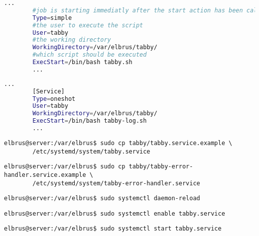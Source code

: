 	\lstset{style=files}
	\begin{lstlisting}[caption={tabby.service.example - Die Variable 'WorkingDirectory' sowie die Variable 'User' anpassen.},language=bash ,keywords={WorkingDirectory, User}, keywordstyle=\color{red}, firstnumber=5]
		...
		#job is starting immediatly after the start action has been called
		Type=simple
		#the user to execute the script
		User=tabby
		#the working directory
		WorkingDirectory=/var/elbrus/tabby/
		#which script should be executed
		ExecStart=/bin/bash tabby.sh
		...
	\end{lstlisting}

	\lstset{style=files}
	\begin{lstlisting}[caption={tabby-error-handler.service.example - Die Variable 'WorkingDirectory' sowie die Variable 'User' anpassen.},language=bash ,keywords={WorkingDirectory, User}, keywordstyle=\color{red}, firstnumber=5]
		...
		[Service]
		Type=oneshot
		User=tabby
		WorkingDirectory=/var/elbrus/tabby/
		ExecStart=/bin/bash tabby-log.sh
		...
	\end{lstlisting}
	\newpage
	
	\lstset{style=commands}
	\begin{lstlisting}[caption={Kopieren des Serviceprogrammes.}]
		elbrus@server:/var/elbrus$ sudo cp tabby/tabby.service.example \
		/etc/systemd/system/tabby.service
	\end{lstlisting}
	
	\lstset{style=commands}
	\begin{lstlisting}[caption={Kopieren des Errorhandlers.}]
		elbrus@server:/var/elbrus$ sudo cp tabby/tabby-error-handler.service.example \
		/etc/systemd/system/tabby-error-handler.service
	\end{lstlisting}
	
	\lstset{style=commands}
	\begin{lstlisting}[caption={Neuladen des 'systemctl' Deamons.}]
		elbrus@server:/var/elbrus$ sudo systemctl daemon-reload
	\end{lstlisting}
	
	\lstset{style=commands}
	\begin{lstlisting}[caption={Aktivieren des Serviceprogrammes.}]
		elbrus@server:/var/elbrus$ sudo systemctl enable tabby.service
	\end{lstlisting}
	
	\lstset{style=commands}
	\begin{lstlisting}[caption={Starten des Serviceprogrammes.}]
		elbrus@server:/var/elbrus$ sudo systemctl start tabby.service
	\end{lstlisting}